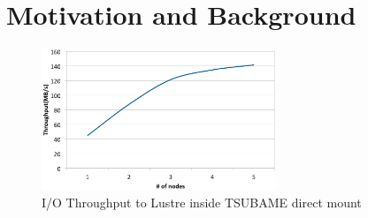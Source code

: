 \documentclass[JIP,draft]{ipsj}
\begin{document}
\section{Motivation and Background}


\begin{figure}[tb]
	\centering
	\includegraphics[width=7cm]{point_to_point_lab}
	\caption{I/O Throughput to Lustre inside TSUBAME direct mount}
	\label{throughput TSUBAME}
\end{figure}
\end{document}
